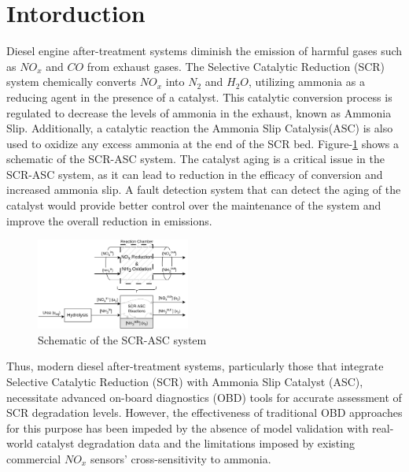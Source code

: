 \section{Intorduction}

Diesel engine after-treatment systems diminish the emission of harmful gases such as $NO_x$ and $CO$ from exhaust gases.
The Selective Catalytic Reduction (SCR) system chemically converts $NO_x$ into $N_2$ and $H_2O$, utilizing ammonia as a
reducing agent in the presence of a catalyst. This catalytic conversion process is regulated to decrease the levels of
ammonia in the exhaust, known as Ammonia Slip. Additionally, a catalytic reaction the Ammonia Slip Catalysis(ASC) is
also used to oxidize any excess ammonia at the end of the SCR bed. Figure-\ref{fig:exhaust_scheme} shows a schematic of
the SCR-ASC system. The catalyst aging is a critical issue in the SCR-ASC system, as it can lead to reduction in the
efficacy of conversion and increased ammonia slip. A fault detection system that can detect the aging of the catalyst
would provide better control over the maintenance of the system and improve the overall reduction in emissions.

\begin{figure}[ht]
    \centering
    \includegraphics[width=0.45\textwidth]{./figs/1_intro/SCR-ASC_ModelReduction.png}
    \caption{Schematic of the SCR-ASC system}
    \label{fig:exhaust_scheme}
\end{figure}

Thus, modern diesel after-treatment systems, particularly those that integrate Selective Catalytic Reduction (SCR) with
Ammonia Slip Catalyst (ASC), necessitate advanced on-board diagnostics (OBD) tools for accurate assessment of SCR
degradation levels. However, the effectiveness of traditional OBD approaches for this purpose has been impeded by the
absence of model validation with real-world catalyst degradation data and the limitations imposed by existing commercial
$NO_x$ sensors' cross-sensitivity to ammonia.

